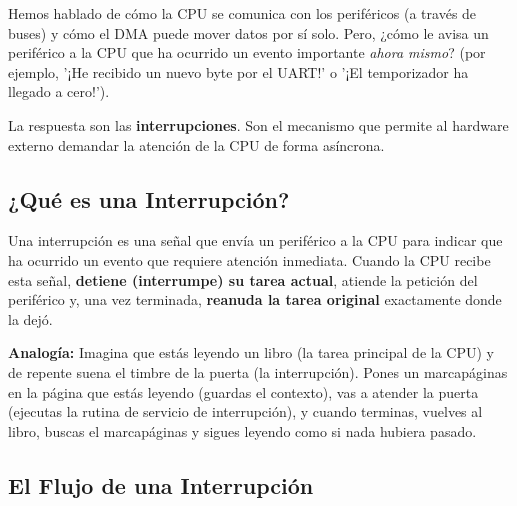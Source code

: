 \documentclass[12pt,a4paper]{article}
\begin{document}
Hemos hablado de cómo la CPU se comunica con los periféricos (a través de buses) y cómo el DMA puede mover datos por sí solo. Pero, ¿cómo le avisa un periférico a la CPU que ha ocurrido un evento importante \textit{ahora mismo}? (por ejemplo, '¡He recibido un nuevo byte por el UART!' o '¡El temporizador ha llegado a cero!').

La respuesta son las \textbf{interrupciones}. Son el mecanismo que permite al hardware externo demandar la atención de la CPU de forma asíncrona.

\subsection{¿Qué es una Interrupción?}

Una interrupción es una señal que envía un periférico a la CPU para indicar que ha ocurrido un evento que requiere atención inmediata. Cuando la CPU recibe esta señal, \textbf{detiene (interrumpe) su tarea actual}, atiende la petición del periférico y, una vez terminada, \textbf{reanuda la tarea original} exactamente donde la dejó.

\textbf{Analogía:} Imagina que estás leyendo un libro (la tarea principal de la CPU) y de repente suena el timbre de la puerta (la interrupción). Pones un marcapáginas en la página que estás leyendo (guardas el contexto), vas a atender la puerta (ejecutas la rutina de servicio de interrupción), y cuando terminas, vuelves al libro, buscas el marcapáginas y sigues leyendo como si nada hubiera pasado.

\subsection{El Flujo de una Interrupción}
\end{document}
